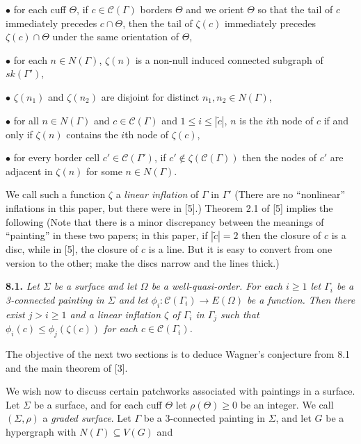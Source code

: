 \hspace*{12pt}$\bullet$ for each cuff $\Theta$, if $c \in \mathcal{C}(\Gamma)$ borders $\Theta$ and we orient $\Theta$ so that the tail of $c$ immediately precedes $c \cap \Theta$, then the tail of $\zeta(c)$ immediately precedes $\zeta(c) \cap \Theta$ under the same orientation of $\Theta$,

\hspace*{12pt}$\bullet$ for each $n \in N(\Gamma)$, $\zeta(n)$ is a non-null induced connected subgraph of $sk(\Gamma')$,

\hspace*{12pt}$\bullet$ $\zeta(n_1)$ and $\zeta(n_2)$ are disjoint for distinct $n_1, n_2 \in N(\Gamma)$,

\hspace*{12pt}$\bullet$ for all $n \in N(\Gamma)$ and $c \in \mathcal{C}(\Gamma)$ and $1 \le i \le |\tilde{c}|$, $n$ is the $i$th node of $c$ if and only if $\zeta(n)$ contains the $i$th node of $\zeta(c)$,

\hspace*{12pt}$\bullet$ for every border cell $c' \in \mathcal{C}(\Gamma')$, if $c' \notin \zeta(\mathcal{C}(\Gamma))$ then the nodes of $c'$ are adjacent in $\zeta(n)$ for some $n \in N(\Gamma)$.

We call such a function $\zeta$ a \textit{linear inflation} of $\Gamma$ in $\Gamma'$ (There are no ``nonlinear'' inflations in this paper, but there were in [5].) Theorem 2.1 of [5] implies the following (Note that there is a minor discrepancy between the meanings of ``painting'' in these two papers; in this paper, if $|\tilde{c}| = 2$ then the closure of $c$ is a disc, while in [5], the closure of $c$ is a line. But it is easy to convert from one version to the other; make the discs narrow and the lines thick.)

\textbf{8.1.} \textit{Let $\Sigma$ be a surface and let $\Omega$ be a well-quasi-order. For each $i \ge 1$ let $\Gamma_i$ be a 3-connected painting in $\Sigma$ and let $\phi_i : \mathcal{C}(\Gamma_i) \to E(\Omega)$ be a function. Then there exist $j > i \ge 1$ and a linear inflation $\zeta$ of $\Gamma_i$ in $\Gamma_j$ such that $\phi_i(c) \le \phi_j(\zeta(c))$ for each $c \in \mathcal{C}(\Gamma_i)$.}

The objective of the next two sections is to deduce Wagner's conjecture from 8.1 and the main theorem of [3].


We wish now to discuss certain patchworks associated with paintings in a surface. Let $\Sigma$ be a surface, and for each cuff $\Theta$ let $\rho(\Theta) \ge 0$ be an integer. We call $(\Sigma, \rho)$ a \textit{graded surface}. Let $\Gamma$ be a 3-connected painting in $\Sigma$, and let $G$ be a hypergraph with $N(\Gamma) \subseteq V(G)$ and
